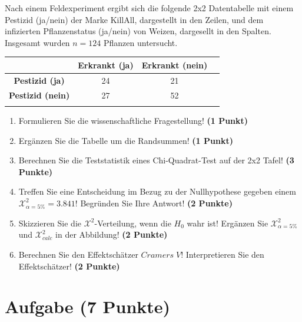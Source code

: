 \documentclass[a4paper, 9pt]{scrartcl}\usepackage[]{graphicx}\usepackage[]{xcolor}
\begin{document}
Nach einem Feldexperiment ergibt sich die folgende 2x2 Datentabelle mit einem
Pestizid (ja/nein) der Marke KillAll, dargestellt in den Zeilen, und
dem infizierten Pflanzenstatus (ja/nein) von Weizen, dargesellt in
den Spalten. Insgesamt wurden $n = 124$ Pflanzen untersucht.
\vspace{5Ex}

\begin{center}
  \Large
  \begin{tabular}{c|c|c|c}
     & \textbf{Erkrankt (ja)} & \textbf{Erkrankt (nein)} &  \strut\\
    \hline
    \textbf{Pestizid (ja)} & 24  & 21  &     \strut\\
    \hline
    \textbf{Pestizid (nein)} & 27  & 52  &      \strut\\
    \hline
     \phantom{100} & \phantom{100}  & \phantom{100}  &  \phantom{100}  \strut\\
  \end{tabular}
\end{center}

\vspace{5Ex}

\begin{enumerate}
\item Formulieren Sie die wissenschaftliche Fragestellung! \textbf{(1 Punkt)}
\item Erg{\"a}nzen Sie die Tabelle um die Randsummen! \textbf{(1 Punkt)} 
\item Berechnen Sie die Teststatistik eines Chi-Quadrat-Test auf der 2x2
  Tafel! \textbf{(3 Punkte)}
\item Treffen Sie eine Entscheidung im Bezug zu der Nullhypothese gegeben
  einem $\mathcal{X}^2_{\alpha = 5\%} = 3.841$! Begr{\"u}nden Sie Ihre Antwort!
  \textbf{(2 Punkte)}
\item Skizzieren Sie die $\mathcal{X}^2$-Verteilung, wenn die $H_0$ wahr
  ist! Erg{\"a}nzen Sie  $\mathcal{X}^2_{\alpha = 5\%}$ und
  $\mathcal{X}^2_{calc}$ in der Abbildung! \textbf{(2 Punkte)}
\item Berechnen Sie den Effektsch{\"a}tzer $Cramers\; V$! Interpretieren Sie den
  Effektsch{\"a}tzer! \textbf{(2 Punkte)}
\end{enumerate} 
\clearpage

\section{Aufgabe \hfill (7 Punkte)}
\end{document}
